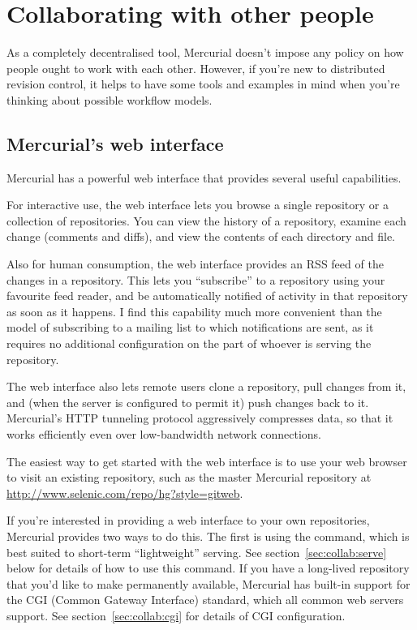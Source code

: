 \chapter{Collaborating with other people}
\label{cha:collab}

As a completely decentralised tool, Mercurial doesn't impose any
policy on how people ought to work with each other.  However, if
you're new to distributed revision control, it helps to have some
tools and examples in mind when you're thinking about possible
workflow models.

\section{Mercurial's web interface}

Mercurial has a powerful web interface that provides several 
useful capabilities.

For interactive use, the web interface lets you browse a single
repository or a collection of repositories.  You can view the history
of a repository, examine each change (comments and diffs), and view
the contents of each directory and file.

Also for human consumption, the web interface provides an RSS feed of
the changes in a repository.  This lets you ``subscribe'' to a
repository using your favourite feed reader, and be automatically
notified of activity in that repository as soon as it happens.  I find
this capability much more convenient than the model of subscribing to
a mailing list to which notifications are sent, as it requires no
additional configuration on the part of whoever is serving the
repository.

The web interface also lets remote users clone a repository, pull
changes from it, and (when the server is configured to permit it) push
changes back to it.  Mercurial's HTTP tunneling protocol aggressively
compresses data, so that it works efficiently even over low-bandwidth
network connections.

The easiest way to get started with the web interface is to use your
web browser to visit an existing repository, such as the master
Mercurial repository at
\url{http://www.selenic.com/repo/hg?style=gitweb}.

If you're interested in providing a web interface to your own
repositories, Mercurial provides two ways to do this.  The first is
using the  command, which is best suited to short-term
``lightweight'' serving.  See section~\ref{sec:collab:serve} below for
details of how to use this command.  If you have a long-lived
repository that you'd like to make permanently available, Mercurial
has built-in support for the CGI (Common Gateway Interface) standard,
which all common web servers support.  See
section~\ref{sec:collab:cgi} for details of CGI configuration.

